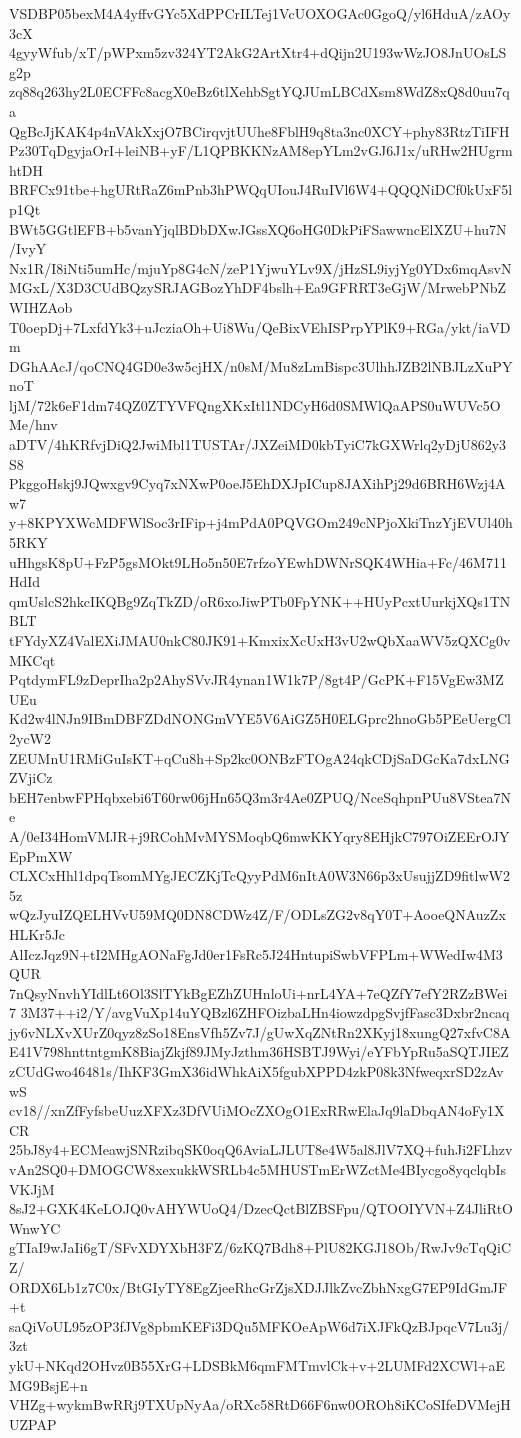 VSDBP05bexM4A4yffvGYc5XdPPCrILTej1VcUOXOGAc0GgoQ/yl6HduA/zAOy3cX
4gyyWfub/xT/pWPxm5zv324YT2AkG2ArtXtr4+dQijn2U193wWzJO8JnUOsLSg2p
zq88q263hy2L0ECFFc8acgX0eBz6tlXehbSgtYQJUmLBCdXsm8WdZ8xQ8d0uu7qa
QgBcJjKAK4p4nVAkXxjO7BCirqvjtUUhe8FblH9q8ta3nc0XCY+phy83RtzTiIFH
Pz30TqDgyjaOrI+leiNB+yF/L1QPBKKNzAM8epYLm2vGJ6J1x/uRHw2HUgrmhtDH
BRFCx91tbe+hgURtRaZ6mPnb3hPWQqUIouJ4RuIVl6W4+QQQNiDCf0kUxF5lp1Qt
BWt5GGtlEFB+b5vanYjqlBDbDXwJGssXQ6oHG0DkPiFSawwncElXZU+hu7N/IvyY
Nx1R/I8iNti5umHc/mjuYp8G4cN/zeP1YjwuYLv9X/jHzSL9iyjYg0YDx6mqAsvN
MGxL/X3D3CUdBQzySRJAGBozYhDF4bslh+Ea9GFRRT3eGjW/MrwebPNbZWIHZAob
T0oepDj+7LxfdYk3+uJcziaOh+Ui8Wu/QeBixVEhISPrpYPlK9+RGa/ykt/iaVDm
DGhAAcJ/qoCNQ4GD0e3w5cjHX/n0sM/Mu8zLmBispc3UlhhJZB2lNBJLzXuPYnoT
ljM/72k6eF1dm74QZ0ZTYVFQngXKxItl1NDCyH6d0SMWlQaAPS0uWUVc5OMe/hnv
aDTV/4hKRfvjDiQ2JwiMbl1TUSTAr/JXZeiMD0kbTyiC7kGXWrlq2yDjU862y3S8
PkggoHskj9JQwxgv9Cyq7xNXwP0oeJ5EhDXJpICup8JAXihPj29d6BRH6Wzj4Aw7
y+8KPYXWcMDFWlSoc3rIFip+j4mPdA0PQVGOm249cNPjoXkiTnzYjEVUl40h5RKY
uHhgsK8pU+FzP5gsMOkt9LHo5n50E7rfzoYEwhDWNrSQK4WHia+Fc/46M711HdId
qmUslcS2hkcIKQBg9ZqTkZD/oR6xoJiwPTb0FpYNK++HUyPcxtUurkjXQs1TNBLT
tFYdyXZ4ValEXiJMAU0nkC80JK91+KmxixXcUxH3vU2wQbXaaWV5zQXCg0vMKCqt
PqtdymFL9zDeprIha2p2AhySVvJR4ynan1W1k7P/8gt4P/GcPK+F15VgEw3MZUEu
Kd2w4lNJn9IBmDBFZDdNONGmVYE5V6AiGZ5H0ELGprc2hnoGb5PEeUergCl2ycW2
ZEUMnU1RMiGuIsKT+qCu8h+Sp2kc0ONBzFTOgA24qkCDjSaDGcKa7dxLNGZVjiCz
bEH7enbwFPHqbxebi6T60rw06jHn65Q3m3r4Ae0ZPUQ/NceSqhpnPUu8VStea7Ne
A/0eI34HomVMJR+j9RCohMvMYSMoqbQ6mwKKYqry8EHjkC797OiZEErOJYEpPmXW
CLXCxHhl1dpqTsomMYgJECZKjTcQyyPdM6nItA0W3N66p3xUsujjZD9fitlwW25z
wQzJyuIZQELHVvU59MQ0DN8CDWz4Z/F/ODLsZG2v8qY0T+AooeQNAuzZxHLKr5Jc
AlIczJqz9N+tI2MHgAONaFgJd0er1FsRc5J24HntupiSwbVFPLm+WWedIw4M3QUR
7nQsyNnvhYIdlLt6Ol3SlTYkBgEZhZUHnloUi+nrL4YA+7eQZfY7efY2RZzBWei7
3M37++i2/Y/avgVuXp14uYQBzl6ZHFOizbaLHn4iowzdpgSvjfFasc3Dxbr2ncaq
jy6vNLXvXUrZ0qyz8zSo18EnsVfh5Zv7J/gUwXqZNtRn2XKyj18xungQ27xfvC8A
E41V798hnttntgmK8BiajZkjf89JMyJzthm36HSBTJ9Wyi/eYFbYpRu5aSQTJIEZ
zCUdGwo46481s/IhKF3GmX36idWhkAiX5fgubXPPD4zkP08k3NfweqxrSD2zAvwS
cv18//xnZfFyfsbeUuzXFXz3DfVUiMOcZXOgO1ExRRwElaJq9laDbqAN4oFy1XCR
25bJ8y4+ECMeawjSNRzibqSK0oqQ6AviaLJLUT8e4W5al8JlV7XQ+fuhJi2FLhzv
vAn2SQ0+DMOGCW8xexukkWSRLb4c5MHUSTmErWZctMe4BIycgo8yqclqbIsVKJjM
8sJ2+GXK4KeLOJQ0vAHYWUoQ4/DzecQctBlZBSFpu/QTOOIYVN+Z4JliRtOWnwYC
gTIaI9wJaIi6gT/SFvXDYXbH3FZ/6zKQ7Bdh8+PlU82KGJ18Ob/RwJv9cTqQiCZ/
ORDX6Lb1z7C0x/BtGIyTY8EgZjeeRhcGrZjsXDJJlkZvcZbhNxgG7EP9IdGmJF+t
saQiVoUL95zOP3fJVg8pbmKEFi3DQu5MFKOeApW6d7iXJFkQzBJpqcV7Lu3j/3zt
ykU+NKqd2OHvz0B55XrG+LDSBkM6qmFMTmvlCk+v+2LUMFd2XCWl+aEMG9BsjE+n
VHZg+wykmBwRRj9TXUpNyAa/oRXc58RtD66F6nw0OROh8iKCoSIfeDVMejHUZPAP
